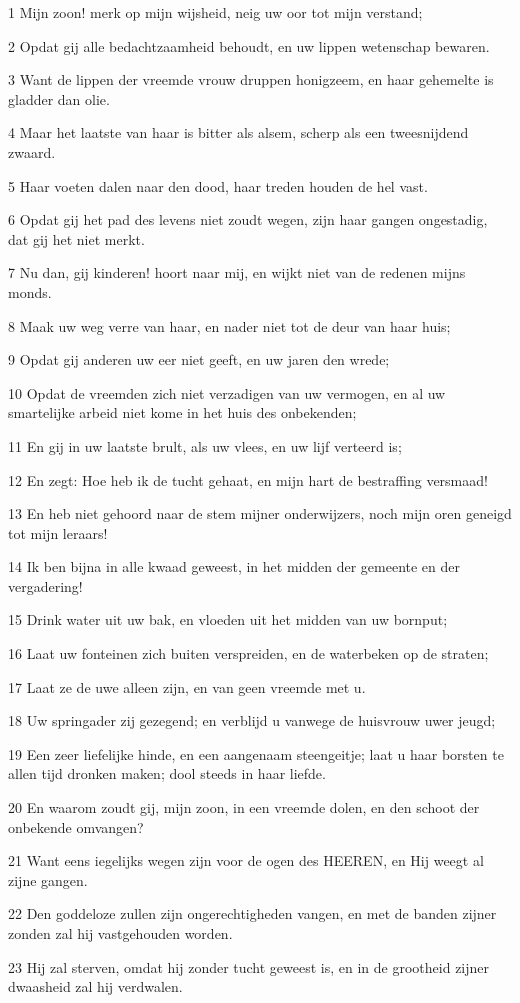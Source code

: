 \par 1 Mijn zoon! merk op mijn wijsheid, neig uw oor tot mijn verstand;
\par 2 Opdat gij alle bedachtzaamheid behoudt, en uw lippen wetenschap bewaren.
\par 3 Want de lippen der vreemde vrouw druppen honigzeem, en haar gehemelte is gladder dan olie.
\par 4 Maar het laatste van haar is bitter als alsem, scherp als een tweesnijdend zwaard.
\par 5 Haar voeten dalen naar den dood, haar treden houden de hel vast.
\par 6 Opdat gij het pad des levens niet zoudt wegen, zijn haar gangen ongestadig, dat gij het niet merkt.
\par 7 Nu dan, gij kinderen! hoort naar mij, en wijkt niet van de redenen mijns monds.
\par 8 Maak uw weg verre van haar, en nader niet tot de deur van haar huis;
\par 9 Opdat gij anderen uw eer niet geeft, en uw jaren den wrede;
\par 10 Opdat de vreemden zich niet verzadigen van uw vermogen, en al uw smartelijke arbeid niet kome in het huis des onbekenden;
\par 11 En gij in uw laatste brult, als uw vlees, en uw lijf verteerd is;
\par 12 En zegt: Hoe heb ik de tucht gehaat, en mijn hart de bestraffing versmaad!
\par 13 En heb niet gehoord naar de stem mijner onderwijzers, noch mijn oren geneigd tot mijn leraars!
\par 14 Ik ben bijna in alle kwaad geweest, in het midden der gemeente en der vergadering!
\par 15 Drink water uit uw bak, en vloeden uit het midden van uw bornput;
\par 16 Laat uw fonteinen zich buiten verspreiden, en de waterbeken op de straten;
\par 17 Laat ze de uwe alleen zijn, en van geen vreemde met u.
\par 18 Uw springader zij gezegend; en verblijd u vanwege de huisvrouw uwer jeugd;
\par 19 Een zeer liefelijke hinde, en een aangenaam steengeitje; laat u haar borsten te allen tijd dronken maken; dool steeds in haar liefde.
\par 20 En waarom zoudt gij, mijn zoon, in een vreemde dolen, en den schoot der onbekende omvangen?
\par 21 Want eens iegelijks wegen zijn voor de ogen des HEEREN, en Hij weegt al zijne gangen.
\par 22 Den goddeloze zullen zijn ongerechtigheden vangen, en met de banden zijner zonden zal hij vastgehouden worden.
\par 23 Hij zal sterven, omdat hij zonder tucht geweest is, en in de grootheid zijner dwaasheid zal hij verdwalen.

